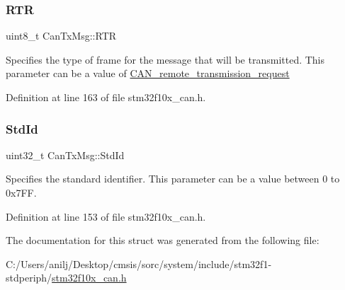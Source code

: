 \mbox{\label{struct_can_tx_msg_a69f84255db38c6910058f290efdb7302}} 
\subsubsection{\texorpdfstring{R\+TR}{RTR}}
{\footnotesize\ttfamily uint8\+\_\+t Can\+Tx\+Msg\+::\+R\+TR}

Specifies the type of frame for the message that will be transmitted. This parameter can be a value of \hyperlink{group___c_a_n__remote__transmission__request}{C\+A\+N\+\_\+remote\+\_\+transmission\+\_\+request} 

Definition at line 163 of file stm32f10x\+\_\+can.\+h.

\mbox{\label{struct_can_tx_msg_abfb50c8208227f8cf378f29cf9a3a6f3}} 
\subsubsection{\texorpdfstring{Std\+Id}{StdId}}
{\footnotesize\ttfamily uint32\+\_\+t Can\+Tx\+Msg\+::\+Std\+Id}

Specifies the standard identifier. This parameter can be a value between 0 to 0x7\+FF. 

Definition at line 153 of file stm32f10x\+\_\+can.\+h.



The documentation for this struct was generated from the following file\+:\begin{DoxyCompactItemize}
\item 
C\+:/\+Users/anilj/\+Desktop/cmsis/sorc/system/include/stm32f1-\/stdperiph/\hyperlink{stm32f10x__can_8h}{stm32f10x\+\_\+can.\+h}\end{DoxyCompactItemize}
